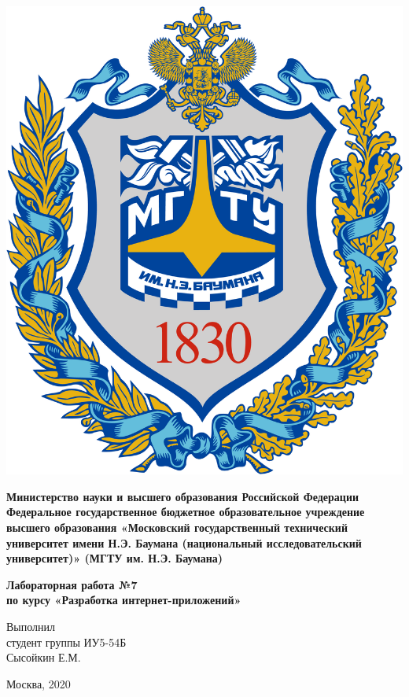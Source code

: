 \documentclass[20pt,a4paper]{report}
\begin{document}
	\begin{titlepage}
		\begin{minipage}{0.3\textwidth}
		\includegraphics[scale=0.03]{logo.png}	
		\end{minipage}
		\begin{minipage}{0.6\textwidth}\centering
			\textbf{
				Министерство науки и высшего образования Российской Федерации
				Федеральное государственное бюджетное образовательное 
				учреждение высшего образования
				«Московский государственный технический университет
				имени Н.Э. Баумана (национальный исследовательский университет)»
				(МГТУ им. Н.Э. Баумана)
			}	
		\end{minipage}
	
		\vspace{5cm}
		\centering
		\Large
		\textbf{
			Лабораторная работа №7 \\
			по курсу «Разработка интернет-приложений» \\
		}

		\vspace{6cm}
		\begin{flushright}
			Выполнил \\ 
			студент группы ИУ5-54Б \\ 
			Сысойкин Е.М. 
		\end{flushright}
		\vspace{5cm}
		Москва, 2020
	\end{titlepage}
\end{document}
